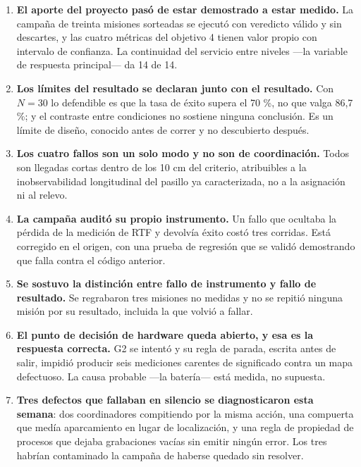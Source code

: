 \documentclass[12pt,letterpaper]{article}
\begin{document}
\begin{enumerate}[leftmargin=*]
    \item \textbf{El aporte del proyecto pasó de estar demostrado a estar medido.} La campaña de treinta misiones sorteadas se ejecutó con veredicto válido y sin descartes, y las cuatro métricas del objetivo 4 tienen valor propio con intervalo de confianza. La continuidad del servicio entre niveles ---la variable de respuesta principal--- da 14 de 14.

    \item \textbf{Los límites del resultado se declaran junto con el resultado.} Con $N = 30$ lo defendible es que la tasa de éxito supera el 70 \%, no que valga 86,7 \%; y el contraste entre condiciones no sostiene ninguna conclusión. Es un límite de diseño, conocido antes de correr y no descubierto después.

    \item \textbf{Los cuatro fallos son un solo modo y no son de coordinación.} Todos son llegadas cortas dentro de los 10 cm del criterio, atribuibles a la inobservabilidad longitudinal del pasillo ya caracterizada, no a la asignación ni al relevo.

    \item \textbf{La campaña auditó su propio instrumento.} Un fallo que ocultaba la pérdida de la medición de RTF y devolvía éxito costó tres corridas. Está corregido en el origen, con una prueba de regresión que se validó demostrando que falla contra el código anterior.

    \item \textbf{Se sostuvo la distinción entre fallo de instrumento y fallo de resultado.} Se regrabaron tres misiones no medidas y no se repitió ninguna misión por su resultado, incluida la que volvió a fallar.

    \item \textbf{El punto de decisión de hardware queda abierto, y esa es la respuesta correcta.} G2 se intentó y su regla de parada, escrita antes de salir, impidió producir seis mediciones carentes de significado contra un mapa defectuoso. La causa probable ---la batería--- está medida, no supuesta.

    \item \textbf{Tres defectos que fallaban en silencio se diagnosticaron esta semana}: dos coordinadores compitiendo por la misma acción, una compuerta que medía aparcamiento en lugar de localización, y una regla de propiedad de procesos que dejaba grabaciones vacías sin emitir ningún error. Los tres habrían contaminado la campaña de haberse quedado sin resolver.
\end{enumerate}
\end{document}
